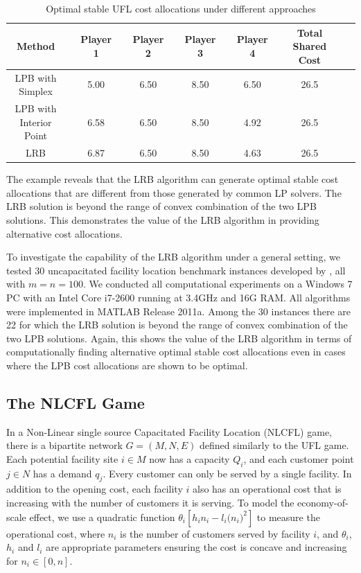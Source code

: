 \documentclass[ijoc,nonblindrev]{informs3} %
\begin{document}
\begin{table}[H]
\vspace{-2mm}
\centering
\tabcolsep=4pt
\small
\renewcommand\arraystretch{1.5}
\caption{\label{table:UFLCA} Optimal stable UFL cost allocations under different approaches}
\begin{tabular}[!h]{c c c c c c c c c c c c c}
\hline
\multicolumn{1}{c}{Method} &\multicolumn{1}{c}{} &\multicolumn{1}{c}{Player 1} &\multicolumn{1}{c}{} &\multicolumn{1}{c}{Player 2} &\multicolumn{1}{c}{} &\multicolumn{1}{c}{Player 3} &\multicolumn{1}{c}{} &\multicolumn{1}{c}{Player 4}	&\multicolumn{1}{c}{} &\multicolumn{1}{c}{Total Shared Cost}\\
\hline
LPB with Simplex	& &5.00	& &6.50	& &8.50	& &6.50	&	&26.5	&\\
LPB with Interior Point	& &6.58	& &6.50	& &8.50	& &4.92	&	&26.5	&\\
LRB	& &6.87	& &6.50	& &8.50	& &4.63	&	&26.5	&\\
\hline
\end{tabular}
\vspace{-3mm}
\end{table}


The example reveals that the LRB algorithm can generate optimal stable cost allocations that are different from those generated by common LP solvers.
The LRB solution is beyond the range of convex combination of the two LPB solutions.
This demonstrates the value of the LRB algorithm in providing alternative cost allocations.


To investigate the capability of the LRB algorithm under a general setting, we tested 30 uncapacitated facility location benchmark instances developed by \cite{Benchmark}, all with $m=n=100$. We conducted all computational experiments  on a Windows 7 PC with an Intel Core i7-2600 running at 3.4GHz and 16G RAM. All algorithms were implemented in MATLAB Release 2011a.
Among the 30 instances there are 22 for which the LRB solution is  beyond the range of convex combination of the two LPB solutions.
Again, this shows the value of the LRB algorithm in terms of computationally finding alternative optimal stable cost allocations even in cases where the LPB cost allocations are shown to be optimal.


\subsection{The NLCFL Game}\label{section:NLCFL}
In a Non-Linear single source Capacitated Facility Location (NLCFL) game, there is a bipartite network $G=(M,N,E)$ defined similarly to the UFL game. Each potential facility site $i \in M$ now has a capacity $Q_i$, and each customer point $j \in N$ has a demand $q_j$. Every customer can only be served by a single facility.
In addition to the opening cost, each facility $i$ also has an operational cost that is increasing with the number of customers it is serving. To model the economy-of-scale effect, we use  a quadratic function  $\theta_i[h_i n_i - l_i\big(n_i \big)^2]$ to measure the operational cost, where $n_i$ is the number of customers served by facility $i$, and $\theta_i$, $h_i$ and $l_i$ are appropriate parameters ensuring the cost is concave and increasing  for $n_i \in [0,n]$.
\end{document}
